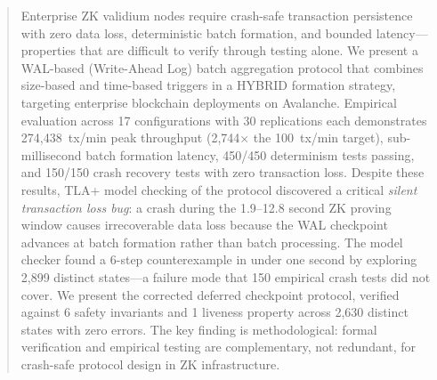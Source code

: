 
\begin{abstract}
Enterprise ZK validium nodes require crash-safe transaction persistence with
zero data loss, deterministic batch formation, and bounded latency---properties
that are difficult to verify through testing alone. We present a WAL-based
(Write-Ahead Log) batch aggregation protocol that combines size-based and
time-based triggers in a HYBRID formation strategy, targeting enterprise
blockchain deployments on Avalanche. Empirical evaluation across 17
configurations with 30 replications each demonstrates 274,438~tx/min peak
throughput (2,744$\times$ the 100~tx/min target), sub-millisecond batch
formation latency, 450/450 determinism tests passing, and 150/150 crash
recovery tests with zero transaction loss. Despite these results, TLA+ model
checking of the protocol discovered a critical \emph{silent transaction loss
bug}: a crash during the 1.9--12.8 second ZK proving window causes
irrecoverable data loss because the WAL checkpoint advances at batch formation
rather than batch processing. The model checker found a 6-step counterexample
in under one second by exploring 2,899 distinct states---a failure mode that
150 empirical crash tests did not cover. We present the corrected deferred
checkpoint protocol, verified against 6 safety invariants and 1 liveness
property across 2,630 distinct states with zero errors. The key finding is
methodological: formal verification and empirical testing are complementary,
not redundant, for crash-safe protocol design in ZK infrastructure.
\end{abstract}
